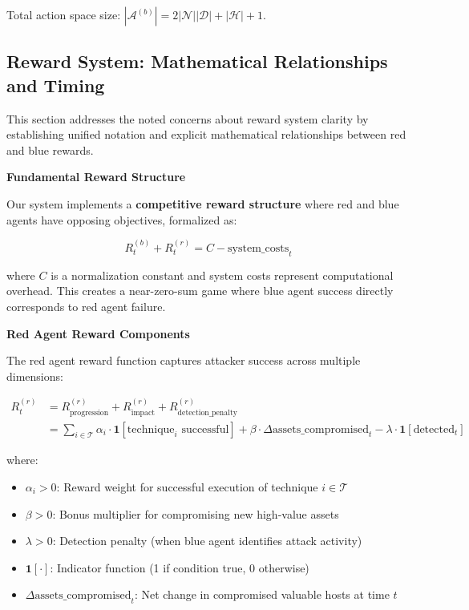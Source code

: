 \documentclass[12pt,oneside]{article}
\begin{document}
Total action space size: $|\mathcal{A}^{(b)}| = 2|\mathcal{N}||\mathcal{D}| + |\mathcal{H}| + 1$.

\subsection{Reward System: Mathematical Relationships and Timing}

This section addresses the noted concerns about reward system clarity by establishing unified notation and explicit mathematical relationships between red and blue rewards.

\textbf{Fundamental Reward Structure}

Our system implements a \textbf{competitive reward structure} where red and blue agents have opposing objectives, formalized as:

\begin{equation}
R^{(b)}_t + R^{(r)}_t = C - \text{system\_costs}_t
\end{equation}

where $C$ is a normalization constant and system costs represent computational overhead. This creates a near-zero-sum game where blue agent success directly corresponds to red agent failure.

\textbf{Red Agent Reward Components}

The red agent reward function captures attacker success across multiple dimensions:

\begin{align}
R^{(r)}_t &= R^{(r)}_{\text{progression}} + R^{(r)}_{\text{impact}} + R^{(r)}_{\text{detection\_penalty}} \\
&= \sum_{i \in \mathcal{T}} \alpha_i \cdot \mathbf{1}[\text{technique}_i \text{ successful}] + \beta \cdot \Delta\text{assets\_compromised}_t - \lambda \cdot \mathbf{1}[\text{detected}_t]
\end{align}

where:
\begin{itemize}
    \item $\alpha_i > 0$: Reward weight for successful execution of technique $i \in \mathcal{T}$
    \item $\beta > 0$: Bonus multiplier for compromising new high-value assets
    \item $\lambda > 0$: Detection penalty (when blue agent identifies attack activity)
    \item $\mathbf{1}[\cdot]$: Indicator function (1 if condition true, 0 otherwise)
    \item $\Delta\text{assets\_compromised}_t$: Net change in compromised valuable hosts at time $t$
\end{itemize}
\end{document}
